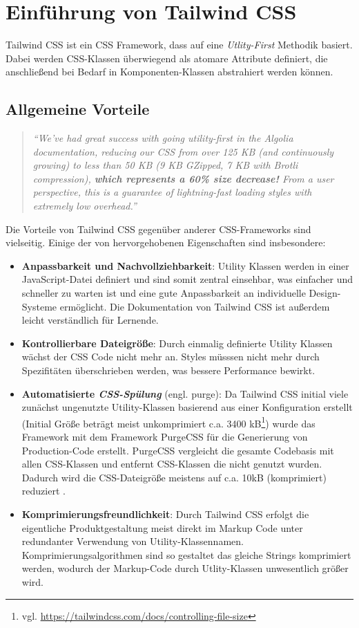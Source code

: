 \chapter{Einführung von Tailwind CSS}
\label{cha:Tailwindcss}
Tailwind CSS ist ein CSS Framework, dass auf eine \textit{Utlity-First} Methodik basiert. Dabei werden CSS-Klassen überwiegend als atomare Attribute definiert, die anschließend bei Bedarf in Komponenten-Klassen abstrahiert werden können.

\section{Allgemeine Vorteile}
\begin{quotation}
	\emph{``We’ve had great success with going utility-first in the Algolia documentation, reducing our CSS from over 125 KB (and continuously growing) to less than 50 KB (9 KB GZipped, 7 KB with Brotli compression), \textbf{which represents a 60\% size decrease!} From a user perspective, this is a guarantee of lightning-fast loading styles with extremely low overhead.''}
	\citep{AlgoliaTailwindBlog}
\end{quotation}
Die Vorteile von Tailwind CSS gegenüber anderer CSS-Frameworks sind vielseitig. Einige der von \cite{AlgoliaTailwindBlog} hervorgehobenen Eigenschaften sind insbesondere:
\begin{itemize}
  \item \textbf{Anpassbarkeit und Nachvollziehbarkeit}: Utility Klassen werden in einer JavaScript-Datei definiert und sind somit zentral einsehbar, was einfacher und schneller zu warten ist und eine gute Anpassbarkeit an individuelle Design-Systeme ermöglicht. Die Dokumentation von Tailwind CSS ist außerdem leicht verständlich für Lernende.
  \item \textbf{Kontrollierbare Dateigröße}: Durch einmalig definierte Utility Klassen wächst der CSS Code nicht mehr an. Styles müsssen nicht mehr durch Spezifitäten überschrieben werden, was bessere Performance bewirkt.
  \item \textbf{Automatisierte \textit{CSS-Spülung}} (engl. purge): Da Tailwind CSS initial viele zunächst ungenutzte Utility-Klassen basierend aus einer Konfiguration erstellt (Initial Größe beträgt meist unkomprimiert c.a. 3400 kB\footnote{vgl. \url{https://tailwindcss.com/docs/controlling-file-size}}) wurde das Framework mit dem Framework PurgeCSS für die Generierung von Production-Code erstellt. PurgeCSS vergleicht die gesamte Codebasis mit allen CSS-Klassen und entfernt CSS-Klassen die nicht genutzt wurden. Dadurch wird die CSS-Dateigröße meistens auf c.a. 10kB (komprimiert) reduziert \citep{TailwindcssDocsFileControll}.
  \item \textbf{Komprimierungsfreundlichkeit}: Durch Tailwind CSS erfolgt die eigentliche Produktgestaltung meist direkt im Markup Code unter redundanter Verwendung von Utility-Klassennamen. Komprimierungsalgorithmen sind so gestaltet das gleiche Strings komprimiert werden, wodurch der Markup-Code durch Utlity-Klassen unwesentlich größer wird.
\end{itemize}


